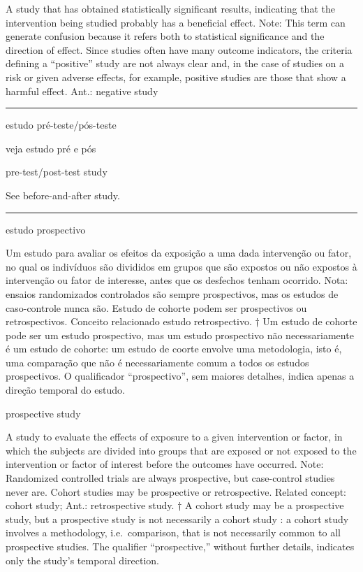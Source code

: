 \documentclass[
  openany]{book}
\begin{document}
A study that has obtained statistically significant results, indicating that the intervention being studied probably has a beneficial effect. Note: This term can generate confusion because it refers both to statistical significance and the direction of effect. Since studies often have many outcome indicators, the criteria defining a ``positive'' study are not always clear and, in the case of studies on a risk or given adverse effects, for example, positive studies are those that show a harmful effect. Ant.: negative study

\begin{center}\rule{0.5\linewidth}{0.5pt}\end{center}

estudo pré-teste/pós-teste

veja estudo pré e pós

pre-test/post-test study

See before-and-after study.

\begin{center}\rule{0.5\linewidth}{0.5pt}\end{center}

estudo prospectivo

Um estudo para avaliar os efeitos da exposição a uma dada intervenção ou fator, no qual os indivíduos são divididos em grupos que são expostos ou não expostos à intervenção ou fator de interesse, antes que os desfechos tenham ocorrido. Nota: ensaios randomizados controlados são sempre prospectivos, mas os estudos de caso-controle nunca são. Estudo de cohorte podem ser prospectivos ou retrospectivos. Conceito relacionado estudo retrospectivo. † Um estudo de cohorte pode ser um estudo prospectivo, mas um estudo prospectivo não necessariamente é um estudo de cohorte: um estudo de coorte envolve uma metodologia, isto é, uma comparação que não é necessariamente comum a todos os estudos prospectivos. O qualificador ``prospectivo'', sem maiores detalhes, indica apenas a direção temporal do estudo.

prospective study

A study to evaluate the effects of exposure to a given intervention or factor, in which the subjects are divided into groups that are exposed or not exposed to the intervention or factor of interest before the outcomes have occurred. Note: Randomized controlled trials are always prospective, but case-control studies never are. Cohort studies may be prospective or retrospective. Related concept: cohort study; Ant.: retrospective study. † A cohort study may be a prospective study, but a prospective study is not necessarily a cohort study : a cohort study involves a methodology, i.e.~comparison, that is not necessarily common to all prospective studies. The qualifier ``prospective,'' without further details, indicates only the study's temporal direction.
\end{document}
